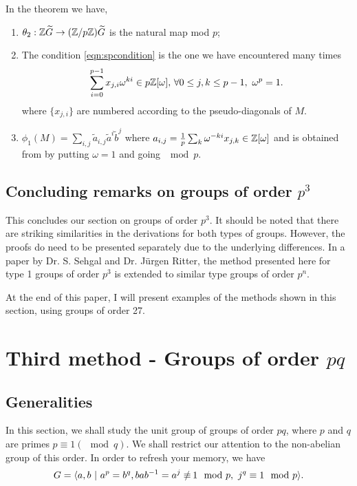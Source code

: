 \documentclass[11pt]{report}
\begin{document}
In the theorem we have,
\begin{enumerate}
\item \( \theta_2: \mathbb{Z}\widetilde{G}\rightarrow ( \mathbb{Z}/p \mathbb{Z})\widetilde{G}\) is the natural map mod $p$;

\item The condition  \ref{eqn:spcondition} is the one we have encountered many times 
\begin{equation*}
\sum_{i=0}^{p-1} x_{j,i}\omega{}^{ki} \in{} p \mathbb{Z}[\omega],\, \forall 0\leq{}j,k\leq{}p-1,\ \omega^p = 1.
\end{equation*}
        where  \(\{x_{j,i}\}\) are numbered according to the pseudo-diagonals of $M$.

\item \(\phi_1(M) = \sum_{i,j}\tilde{a}_{i,j}\tilde{a}^i\tilde{b}^j\)
 where \( a_{i,j} = \frac{1}{p}\sum_k\omega^{-ki}x_{j,k} \in  \mathbb{Z}[\omega] \)
and \tildeaij is obtained from \aij by putting $\omega=1$ and going $\mod{p}$.
\end{enumerate}


\subsection{Concluding remarks on groups of order $p^3$}
        This concludes our section on groups of order $p^3$. It should be 
noted that there are
striking similarities in the derivations for both types of 
groups. However, the proofs do need
to be presented separately due to the underlying differences. In 
a paper by Dr. S. Sehgal and
Dr. J\"urgen Ritter, \cite{bib:ritter1981} the method presented here for type 1 groups 
of order \(p^3\) is extended to
similar type groups of order $p^n$.


        At the end of this paper, I will present examples of the methods 
shown in this section,
using groups of order 27.



\section{Third method - Groups of order $pq$}\label{sec:thirdmethod}
\subsection{Generalities}\label{sec:thirdmethod:generalities}
        In this section, we shall study the unit group of groups of order 
$pq$, where 
$p$ and $q$ are
primes $p\equiv 1 (\mod{q})$. We shall restrict our attention to the 
non-abelian group of this order. In
order to refresh your memory, we have
\begin{equation}
 G = \ggen{a,b\ \vert\ a^p = b^q, bab^{-1} = a^j \notequiv{}\ 1 \mod{p},\ 
 j^q \equiv   1 \mod{p}}.
\end{equation}
\end{document}
